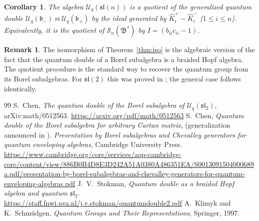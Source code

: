 \documentclass{article}
\newtheorem{corollary}[theorem]{Corollary}
\theoremstyle{definition}
\newtheorem{remark}[theorem]{Remark}
\newcommand{\Uc}{\mathcal{U}}
\newcommand{\bcS}{\mathcal{S}}
\newcommand{\fB}{\mathfrak{B}}
\newcommand{\fb}{\mathfrak{b}}
\newcommand{\sl}{\mathfrak{sl}}
\newcommand{\bipr}{\bowtie}
\begin{document}
\begin{corollary}
The algebra $\Uc_q(\sl(n))$ is a quotient of the generalized quantum double $\Uc_q(\fb_-)\bipr \Uc_q(\fb_+)$ by the ideal generated by $\hat K_i^+ - \hat K_i^-$ ($1\le i\le n$). Equivalently, it is the quotient of $\bcS_n(\fB^*)$ by $I=(b_{ii}c_{ii}-1)$.
\end{corollary}

\begin{remark}
The isomorphism of Theorem~\ref{thm:iso} is the algebraic version of the fact that the quantum double of a Borel subalgebra is a braided Hopf algebra. The quotient procedure is the standard way to recover the quantum group from its Borel subalgebras. For $\sl(2)$ this was proved in \cite[Corollary~2.12]{StokmanDouble}; the general case follows identically.
\end{remark}

\begin{thebibliography}{99}
 S.~Chen, \emph{The quantum double of the Borel subalgebra of $\Uc_q(\sl_2)$}, arXiv:math/0512563. \url{https://arxiv.org/pdf/math/0512563}
 S.~Chen, \emph{Quantum double of the Borel subalgebra for arbitrary Cartan matrix}, (generalization announced in \cite{Chen}).
 \emph{Presentation by Borel subalgebras and Chevalley generators for quantum enveloping algebras}, Cambridge University Press. \url{https://www.cambridge.org/core/services/aop-cambridge-core/content/view/886B0B4D8E3D242A51A0380A486351EA/S0013091504000689a.pdf/presentation-by-borel-subalgebras-and-chevalley-generators-for-quantum-enveloping-algebras.pdf}
 J.~V.~Stokman, \emph{Quantum double as a braided Hopf algebra and quantum $\sl_2$}. \url{https://staff.fnwi.uva.nl/j.v.stokman/quantumdouble2.pdf}
 A.~Klimyk and K.~Schm\"udgen, \emph{Quantum Groups and Their Representations}, Springer, 1997.
\end{thebibliography}
\end{document}
